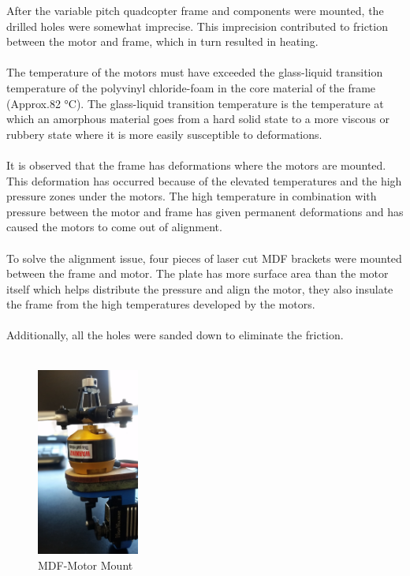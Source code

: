 After the variable pitch quadcopter frame and components were mounted, the drilled holes were somewhat imprecise. This imprecision contributed to friction between the motor and frame, which in turn resulted in heating.\\
\\
The temperature of the motors must have exceeded the glass-liquid transition temperature of the polyvinyl chloride-foam in the core material of the frame (Approx.82 °C). The glass-liquid transition temperature is the temperature at which an amorphous material goes from a hard solid state to a more viscous or rubbery state where it is more easily susceptible to deformations. \\
\\
It is observed that the frame has deformations where the motors are mounted. This deformation has occurred because of the elevated temperatures and the high pressure zones under the motors. The high temperature in combination with pressure between the motor and frame has given permanent deformations and has caused the motors to come out of alignment.  \\
\\
To solve the alignment issue, four pieces of laser cut MDF brackets were mounted between the frame and motor. The plate has more surface area than the motor itself which helps distribute the pressure and align the motor, they also insulate the frame from the high temperatures developed by the motors.\\
\\
Additionally, all the holes were sanded down to eliminate the friction. \\
\\

\begin{figure}[H]
    \centering
         \includegraphics[width = 0.3\textwidth]{VAPIQ-PICTURES/MDFmotorPlate}
      \caption{MDF-Motor Mount}
\end{figure} 


